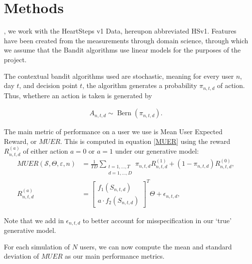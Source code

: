 
\chapter{Methods}
\label{Methods}

,  we work with the HeartSteps v1 Data, hereupon abbreviated HSv1.  Features have been created from the measurements through domain science, through which we assume that the Bandit algorithms use linear models for the purposes of the project.

The contextual bandit algorithms used are stochastic, meaning for every user $n$, day $t$, and decision point $t$, the algorithm generates a probability $\pi_{n,t,d}$ of action.  Thus, whethere an action is taken is generated by

\begin{align*}
A_{n,t,d} \sim \operatorname{Bern}(\pi_{n,t,d}).
\end{align*}

The main metric of performance on a user we use is Mean User Expected Reward, or $MUER$. This is computed in equation \ref{MUER} using the reward $R^{(a)}_{n,t,d}$ of either action $a = 0$ or $a = 1$ under our generative model:
\begin{align}
\label{MUER}
MUER(\mathcal{S}, \Theta, \varepsilon,n) &= \frac{1}{TD} \sum_{\substack{t=1,\ldots,T \\ d=1,\ldots,D}} \pi_{n,t,d} R^{(1)}_{n,t,d} + (1-\pi_{n,t,d}) R^{(0)}_{n,t,d}, \\
\label{GenReward}
R^{(a)}_{n,t,d} &= \begin{bmatrix} f_1(S_{n,t,d}) \\
a \cdot f_2(S_{n,t,d})
\end{bmatrix}^T \Theta + \epsilon_{n,t,d},
\end{align}

Note that we add in $\epsilon_{n,t,d}$ to better account for misspecification in our `true' generative model.


For each simulation of $N$ users, we can now compute the mean and standard deviation of $MUER$ as our main performance metrics. \\


